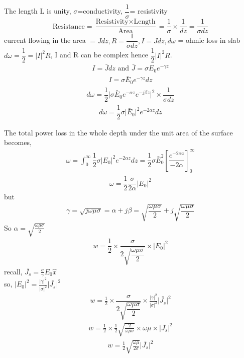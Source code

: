 \begin{center}
The length L is unity,
$\sigma$=conductivity,
$\dfrac{1}{\sigma}$= resistivity
\begin{dmath*}
\text{Resistance} = \dfrac{\text{Resistivity} \times \text{Length}}{\text{Area}}=\dfrac{1}{\sigma}\times\dfrac{1}{dz}=\dfrac{1}{\sigma dz}
\end{dmath*}
current flowing in the area $=Jdz, R=\dfrac{1}{\sigma dz}, I=Jdz, d\omega$ = ohmic loss in slab \\
$d\omega=\dfrac{1}{2}={\lvert I\rvert}^{2}R$, 
I and R can be complex hence $\dfrac{1}{2}{\lvert I\rvert}^{2}R$.
\begin{align*}
I=\bar{J}dz \text{ and } \bar{J} = \sigma E_{0} e^{-\gamma z}
\end{align*}
\begin{align*}
I=\sigma\bar{E}_{0}e^{-\gamma z}dz
\end{align*}
\begin{align*}
d\omega=\dfrac{1}{2}\lvert\sigma\bar{E}_{0}e^{-\alpha z}e^{-j\beta z}\rvert^{2}\times\dfrac{1}{\sigma dz}
\end{align*}
\begin{align*}
d\omega=\dfrac{1}{2}\sigma\lvert\bar{E}_{0}\rvert^{2}e^{-2\alpha z}dz
\end{align*}
\end{center}
The total power loss in the whole depth under the unit area of the surface becomes,
\begin{align}
\omega=\int_{0}^{\infty}\dfrac{1}{2}\sigma\lvert E_{0}\rvert^{2}e^{-2\alpha z}dz=\dfrac{1}{2}\sigma\bar{E}_{0}^{2}[\dfrac{e^{-2\alpha z}}{-2\alpha}]_{0}^{\infty}
\end{align}
\begin{align}
\omega=\dfrac{1}{2}\dfrac{\sigma}{2\alpha}\lvert E_{0}\rvert^{2}
\end{align}
but
\begin{align}
\gamma=\sqrt{j\omega\mu\sigma}=\alpha+j\beta=\sqrt{\dfrac{\omega\mu\sigma}{2}}+j\sqrt{\dfrac{\omega\mu\sigma}{2}}
\end{align}
So $\alpha = \sqrt{\frac{\omega\mu\sigma}{2}}$
\begin{align}
w = 	\dfrac{1}{2}\times\dfrac{\sigma}{2\sqrt{\dfrac{\omega\mu\sigma}{2}}}\times\lvert E_{0}\rvert^{2}
\end{align}
recall, $\bar{J_{s}} = \frac{\sigma}{\gamma}E_{0}\hat{x}$\\
so, $\lvert E_{0}\rvert^{2} = \frac{\lvert \gamma\rvert ^{2}}{\lvert \sigma\rvert^{2}}\lvert \bar{J_{s}}\rvert^{2}$
\begin{align}
w = \frac{1}{2}\times\dfrac{\sigma}{2\sqrt{\dfrac{\omega\mu\sigma}{2}}}\times \frac{\lvert \gamma\rvert ^{2}}{\lvert \sigma\rvert^{2}}\lvert \bar{J_{s}}\rvert^{2} 
\end{align}
\begin{align*}
w = \frac{1}{2}\times\frac{1}{2}\sqrt{\frac{2}{\omega\mu\sigma}}\times\omega\mu\times\lvert \bar{J_{s}}\rvert^{2}
\end{align*}
\begin{align}
w = \frac{1}{2}\sqrt{\frac{\omega\mu}{2\sigma}}\lvert\bar{J_{s}}\rvert^{2}
\end{align}

